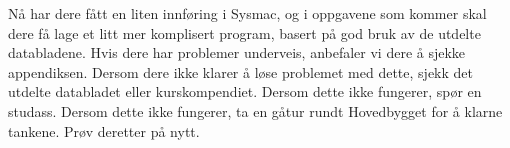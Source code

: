 \begin{alphasection}
Nå har dere fått en liten innføring i Sysmac, og i oppgavene som kommer skal dere få lage et litt mer komplisert program, basert på god bruk av de utdelte databladene. Hvis dere har problemer underveis, anbefaler vi dere å sjekke appendiksen. Dersom dere ikke klarer å løse problemet med dette, sjekk det utdelte databladet eller kurskompendiet. Dersom dette ikke fungerer, spør en studass. Dersom dette ikke fungerer, ta en gåtur rundt Hovedbygget for å klarne tankene. Prøv deretter på nytt.
\end{alphasection}

\setcounter{section}{0}